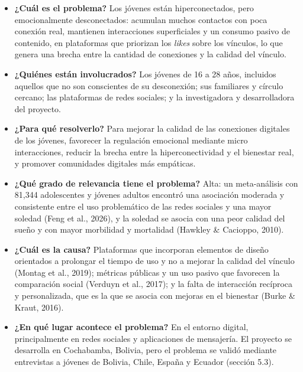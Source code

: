 \begin{itemize}
    \item \textbf{¿Cuál es el problema?} Los jóvenes están hiperconectados, pero emocionalmente desconectados: acumulan muchos contactos con poca conexión real, mantienen interacciones superficiales y un consumo pasivo de contenido, en plataformas que priorizan los \textit{likes} sobre los vínculos, lo que genera una brecha entre la cantidad de conexiones y la calidad del vínculo.
    \item \textbf{¿Quiénes están involucrados?} Los jóvenes de 16 a 28 años, incluidos aquellos que no son conscientes de su desconexión; sus familiares y círculo cercano; las plataformas de redes sociales; y la investigadora y desarrolladora del proyecto.
    \item \textbf{¿Para qué resolverlo?} Para mejorar la calidad de las conexiones digitales de los jóvenes, favorecer la regulación emocional mediante micro interacciones, reducir la brecha entre la hiperconectividad y el bienestar real, y promover comunidades digitales más empáticas.
    \item \textbf{¿Qué grado de relevancia tiene el problema?} Alta: un meta-análisis con 81,344 adolescentes y jóvenes adultos encontró una asociación moderada y consistente entre el uso problemático de las redes sociales y una mayor soledad (Feng et al., 2026), y la soledad se asocia con una peor calidad del sueño y con mayor morbilidad y mortalidad (Hawkley \& Cacioppo, 2010).
    \item \textbf{¿Cuál es la causa?} Plataformas que incorporan elementos de diseño orientados a prolongar el tiempo de uso y no a mejorar la calidad del vínculo (Montag et al., 2019); métricas públicas y un uso pasivo que favorecen la comparación social (Verduyn et al., 2017); y la falta de interacción recíproca y personalizada, que es la que se asocia con mejoras en el bienestar (Burke \& Kraut, 2016).
    \item \textbf{¿En qué lugar acontece el problema?} En el entorno digital, principalmente en redes sociales y aplicaciones de mensajería. El proyecto se desarrolla en Cochabamba, Bolivia, pero el problema se validó mediante entrevistas a jóvenes de Bolivia, Chile, España y Ecuador (sección 5.3).
\end{itemize}

